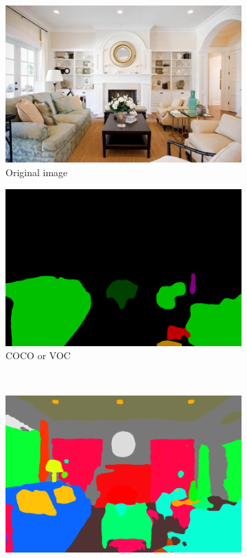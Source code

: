 \documentclass[12pt,a4paper,table,dvipsnames,tikz]{report}
\newcommand{\acronym}{\MakeUppercase}
\begin{document}
	\begin{figure}[h!]
		\centering
		\begin{subfigure}[b]{0.3\textwidth}
			\includegraphics[width=\textwidth]{in}
			\caption{Original image}
		\end{subfigure}
		\begin{subfigure}[b]{0.3\textwidth}
			\includegraphics[width=\textwidth]{in_coco_voc}
			\caption{\acronym{coco} or \acronym{voc}}
		\end{subfigure}
		\\
		\begin{subfigure}[b]{0.3\textwidth}
			\includegraphics[width=\textwidth]{in_ade_fcn}

\end{subfigure}
\end{figure}
\end{document}
